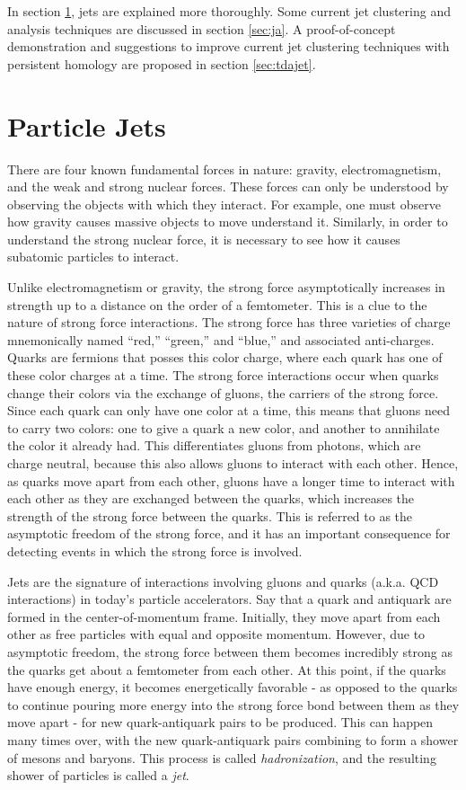 \documentclass[a4paper,12pt]{report}
\begin{document}
In section \ref{sec:jets}, jets are explained more thoroughly. Some current jet clustering and analysis techniques are discussed in section \ref{sec:ja}. A proof-of-concept demonstration and suggestions to improve current jet clustering techniques with persistent homology are proposed in section \ref{sec:tdajet}.  

\section{Particle Jets}\label{sec:jets}
 There are four known fundamental forces in nature: gravity, electromagnetism, and the weak and strong nuclear forces. These forces can only be understood by observing the objects with which they interact. For example, one must observe how gravity causes massive objects to move understand it. Similarly, in order to understand the strong nuclear force, it is necessary to see how it causes subatomic particles to interact. 
 
  Unlike electromagnetism or gravity, the strong force asymptotically increases in strength up to a distance on the order of a femtometer. This is a clue to the nature of strong force interactions. The strong force has three varieties of charge mnemonically named ``red,'' ``green,'' and ``blue,'' and associated anti-charges. Quarks are fermions that posses this color charge, where each quark has one of these color charges at a time. The strong force interactions occur when quarks change their colors via the exchange of gluons, the carriers of the strong force. Since each quark can only have one color at a time, this means that gluons need to carry two colors: one to give a quark a new color, and another to annihilate the color it already had. This differentiates gluons from photons, which are charge neutral, because this also allows gluons to interact with each other. Hence, as quarks move apart from each other, gluons have a longer time to interact with each other as they are exchanged between the quarks, which increases the strength of the strong force between the quarks. This is referred to as the asymptotic freedom of the strong force, and it has an important consequence for detecting events in which the strong force is involved.  
 
 Jets are the signature of interactions involving gluons and quarks (a.k.a. QCD interactions) in today's particle accelerators. Say that a quark and antiquark are formed in the center-of-momentum frame. Initially, they move apart from each other as free particles with equal and opposite momentum. However, due to asymptotic freedom, the strong force between them becomes incredibly strong as the quarks get about a femtometer from each other. At this point, if the quarks have enough energy, it becomes energetically favorable - as opposed to the quarks to continue pouring more energy into the strong force bond between them as they move apart - for new quark-antiquark pairs to be produced. This can happen many times over, with the new quark-antiquark pairs combining to form a shower of mesons and baryons. This process is called \textit{hadronization}, and the resulting shower of particles is called a \textit{jet}.
 
\end{document}
